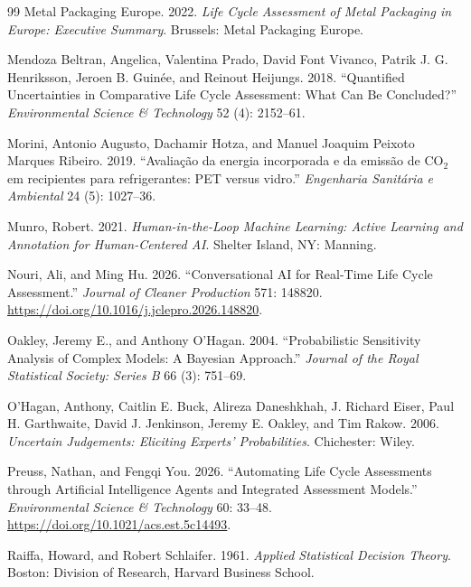 \begin{thebibliography}{99}
Metal Packaging Europe. 2022. \emph{Life Cycle Assessment of Metal Packaging in Europe: Executive Summary}. Brussels: Metal Packaging Europe.

Mendoza Beltran, Angelica, Valentina Prado, David Font Vivanco, Patrik J. G. Henriksson, Jeroen B. Guin\'ee, and Reinout Heijungs. 2018. ``Quantified Uncertainties in Comparative Life Cycle Assessment: What Can Be Concluded?'' \emph{Environmental Science \& Technology} 52 (4): 2152--61.

Morini, Antonio Augusto, Dachamir Hotza, and Manuel Joaquim Peixoto Marques Ribeiro. 2019. ``Avalia\c{c}\~ao da energia incorporada e da emiss\~ao de CO$_2$ em recipientes para refrigerantes: PET versus vidro.'' \emph{Engenharia Sanit\'aria e Ambiental} 24 (5): 1027--36.

Munro, Robert. 2021. \emph{Human-in-the-Loop Machine Learning: Active Learning and Annotation for Human-Centered AI}. Shelter Island, NY: Manning.

Nouri, Ali, and Ming Hu. 2026. ``Conversational AI for Real-Time Life Cycle Assessment.'' \emph{Journal of Cleaner Production} 571: 148820. \url{https://doi.org/10.1016/j.jclepro.2026.148820}.

Oakley, Jeremy E., and Anthony O'Hagan. 2004. ``Probabilistic Sensitivity Analysis of Complex Models: A Bayesian Approach.'' \emph{Journal of the Royal Statistical Society: Series B} 66 (3): 751--69.

O'Hagan, Anthony, Caitlin E. Buck, Alireza Daneshkhah, J. Richard Eiser, Paul H. Garthwaite, David J. Jenkinson, Jeremy E. Oakley, and Tim Rakow. 2006. \emph{Uncertain Judgements: Eliciting Experts' Probabilities}. Chichester: Wiley.

Preuss, Nathan, and Fengqi You. 2026. ``Automating Life Cycle Assessments through Artificial Intelligence Agents and Integrated Assessment Models.'' \emph{Environmental Science \& Technology} 60: 33--48. \url{https://doi.org/10.1021/acs.est.5c14493}.

Raiffa, Howard, and Robert Schlaifer. 1961. \emph{Applied Statistical Decision Theory}. Boston: Division of Research, Harvard Business School.


\end{thebibliography}

